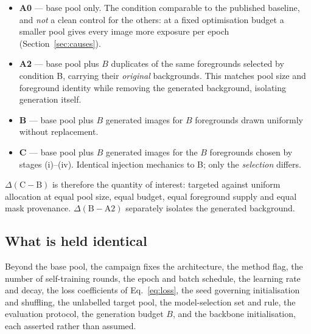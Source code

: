 \documentclass{article}
\begin{document}
\begin{itemize}
\item \textbf{A0} --- base pool only. The condition comparable to the published
      baseline, and \emph{not} a clean control for the others: at a fixed
      optimisation budget a smaller pool gives every image more exposure per
      epoch (Section~\ref{sec:causes}).
\item \textbf{A2} --- base pool plus $B$ duplicates of the same foregrounds
      selected by condition B, carrying their \emph{original} backgrounds. This
      matches pool size and foreground identity while removing the generated
      background, isolating generation itself.
\item \textbf{B} --- base pool plus $B$ generated images for $B$ foregrounds
      drawn uniformly without replacement.
\item \textbf{C} --- base pool plus $B$ generated images for the $B$ foregrounds
      chosen by stages (i)--(iv). Identical injection mechanics to B; only the
      \emph{selection} differs.
\end{itemize}

\noindent
$\Delta(\mathrm{C}-\mathrm{B})$ is therefore the quantity of interest: targeted
against uniform allocation at equal pool size, equal budget, equal foreground
supply and equal mask provenance. $\Delta(\mathrm{B}-\mathrm{A2})$ separately
isolates the generated background.

\subsection{What is held identical}

Beyond the base pool, the campaign fixes the architecture, the method flag, the
number of self-training rounds, the epoch and batch schedule, the learning rate
and decay, the loss coefficients of Eq.~\ref{eq:loss}, the seed governing
initialisation and shuffling, the unlabelled target pool, the model-selection
set and rule, the evaluation protocol, the generation budget $B$, and the
backbone initialisation, each asserted rather than assumed.
\end{document}
